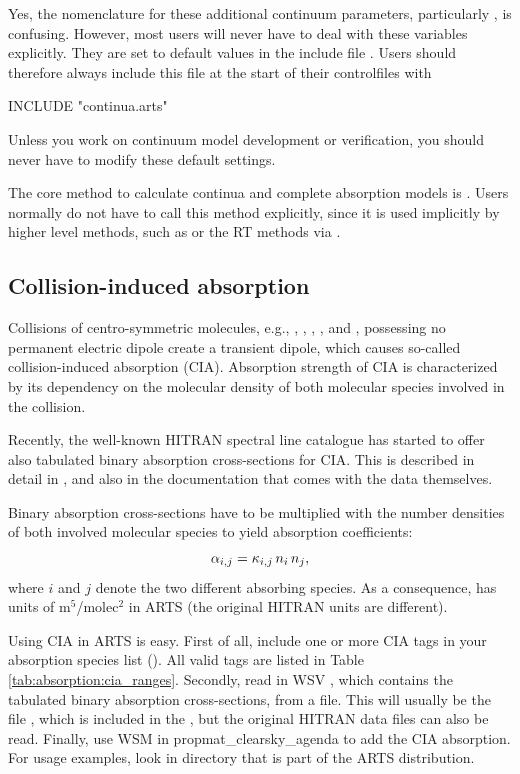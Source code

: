 Yes, the nomenclature for these additional continuum parameters,
particularly , is confusing. However,
most users will never have to deal with these variables
explicitly. They are set to default values in the include file
. Users should therefore always include this file  at
the start of their controlfiles with
\begin{code}
  INCLUDE "continua.arts"
\end{code}
Unless you work on continuum model development or verification, you
should never have to modify these default settings.

The core method to calculate continua and complete absorption models
is . Users normally do not have to
call this method explicitly, since it is used implicitly by higher
level methods, such as  or the
RT methods via .

\subsection{Collision-induced absorption}
\label{sec:absorption:cia}

Collisions of centro-symmetric molecules, e.g., ,
, , , and , possessing no permanent
electric dipole create a transient dipole, which causes so-called collision-induced
absorption (CIA). Absorption strength of CIA is characterized by its dependency
on the molecular density of both molecular species involved in the collision.

Recently, the well-known HITRAN spectral line catalogue has started to
offer also tabulated binary absorption cross-sections for CIA.  This is
described in detail in \citet{richard:12}, and also in the documentation that
comes with the data themselves.

Binary absorption cross-sections
 have to be multiplied with the number densities of both involved
molecular species to yield absorption coefficients:
\begin{equation}
{\alpha}_{i,j} =  {\kappa}_{i,j} \, {n}_{i} \, {n}_{j},
\end{equation}
where $i$ and $j$ denote the two different absorbing species. As a
consequence,  has units of m$^5$/molec$^2$ in ARTS (the
original HITRAN units are different).

Using CIA in ARTS is easy. First of all, include one or more CIA tags
in your absorption species list (). All valid
tags are listed in Table \ref{tab:absorption:cia_ranges}. Secondly,
read in WSV , which contains the tabulated
binary absorption cross-sections, from a file. This will usually be the
file , which is included in the
, but the original HITRAN data files can also be
read. Finally, use WSM  in
propmat\_clearsky\_agenda to add the CIA absorption. For usage examples, look
in directory  that is part
of the ARTS distribution.

